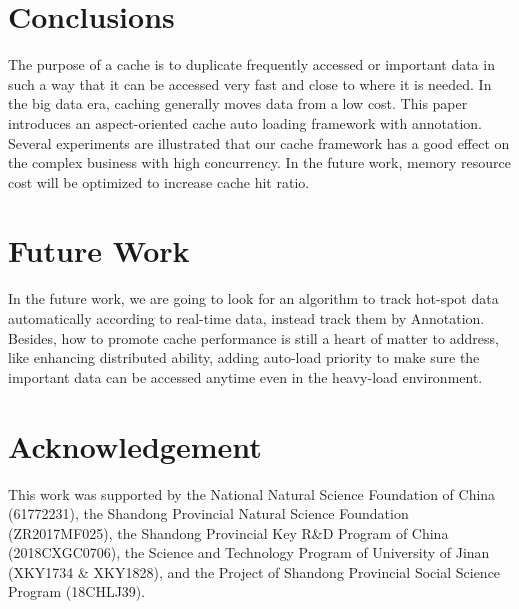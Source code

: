 \documentclass{singlecol-new}
\theoremstyle{TH}{
\newtheorem{lemma}{Lemma}
\newtheorem{theorem}[lemma]{Theorem}
\newtheorem{corrolary}[lemma]{Corrolary}
\newtheorem{conjecture}[lemma]{Conjecture}
\newtheorem{proposition}[lemma]{Proposition}
\newtheorem{claim}[lemma]{Claim}
\newtheorem{stheorem}[lemma]{Wrong Theorem}
}
\theoremstyle{THrm}{
\newtheorem{definition}{Definition}[section]
\newtheorem{question}{Question}[section]
\newtheorem{remark}{Remark}
\newtheorem{scheme}{Scheme}
}
\theoremstyle{THhit}{
\newtheorem{case}{Case}[section]
}
\begin{document}
\section{Conclusions}
\label{Conclusions}

The purpose of a cache is to duplicate frequently accessed or important data in such a way that it can be accessed very fast and close to where it is needed. In the big data era, caching generally moves data from a low cost. This paper introduces an aspect-oriented cache auto loading framework with annotation. Several experiments are illustrated that our cache framework has a good effect on the complex business with high concurrency. In the future work, memory resource cost will be optimized to increase cache hit ratio.

\section{Future Work}
\label{futurework}

In the future work, we are going to look for an algorithm to track hot-spot data automatically according to real-time data, instead track them by Annotation. Besides, how to promote cache performance is still a heart of matter to address, like enhancing distributed ability, adding auto-load priority to make sure the important data can be accessed anytime even in the heavy-load environment.


\section*{Acknowledgement}
This work was supported by the National Natural Science Foundation of China (61772231), the Shandong Provincial Natural Science Foundation (ZR2017MF025), the Shandong Provincial Key R\&D Program of China (2018CXGC0706), the Science and Technology Program of University of Jinan (XKY1734 \& XKY1828), and the Project of Shandong Provincial Social Science Program (18CHLJ39).



%
%
%



\end{document}
